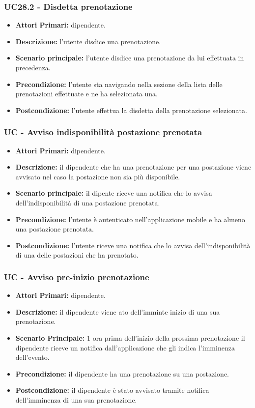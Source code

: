 \subsubsection{ UC28.2 - Disdetta prenotazione}
\begin{itemize}
	\item\textbf{Attori Primari:} dipendente.
	\item\textbf{Descrizione:} l’utente disdice una prenotazione. 
	\item\textbf{Scenario principale:} l’utente disdice una prenotazione da lui effettuata in precedenza.
	\item\textbf{Precondizione:} l'utente sta navigando nella sezione della lista delle prenotazioni effettuate e ne ha selezionata una.
	\item\textbf{Postcondizione:} l’utente effettua la disdetta della prenotazione selezionata.
\end{itemize}

\subsubsection{ UC - Avviso indisponibilità postazione prenotata }
\begin{itemize}
	\item\textbf{Attori Primari:} dipendente.
	\item\textbf{Descrizione:} il dipendente che ha una prenotazione per una postazione viene avvisato nel caso la postazione non sia più disponibile.
	\item\textbf{Scenario principale:} il dipente riceve una notifica che lo avvisa dell'indisponibilità di una postazione prenotata.
	\item\textbf{Precondizione:} l’utente è autenticato nell'applicazione mobile e ha almeno una postazione prenotata.
	\item\textbf{Postcondizione:} l'utente riceve una notifica che lo avvisa dell'indisponibilità di una delle postazioni che ha prenotato.
\end{itemize}



\subsubsection{ UC - Avviso pre-inizio prenotazione }
\begin{itemize}
	\item\textbf{Attori Primari:} dipendente.
	\item\textbf{Descrizione:} il dipendente viene ato dell'imminte inizio di una sua prenotazione.
	\item\textbf{Scenario Principale:} 1 ora prima dell'inizio della prossima prenotazione il dipendente riceve un notifica dall'applicazione che gli indica l'imminenza dell'evento.
	\item\textbf{Precondizione:} il dipendente ha una prenotazione su una postazione.
	\item\textbf{Postcondizione:} il dipendente è stato avvisato tramite notifica dell'imminenza di una sua prenotazione.
\end{itemize}


